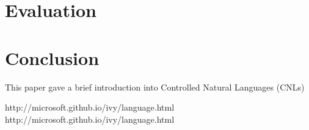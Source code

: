 \documentclass[fleqn]{article}
\begin{document}
\section{Evaluation}


\section{Conclusion}
This paper gave a brief introduction into Controlled Natural Languages (CNLs)

\begin{thebibliography}{99}

     http://microsoft.github.io/ivy/language.html
     http://microsoft.github.io/ivy/language.html
\end{thebibliography}

\end{document}
